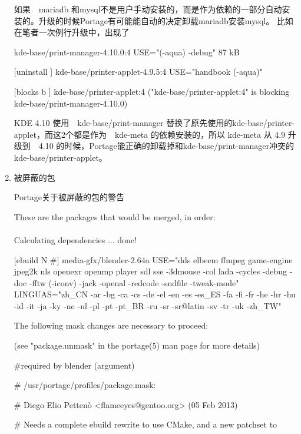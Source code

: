 \begin{enumerate}
如果　mariadb 和mysql不是用户手动安装的，而是作为依赖的一部分自动安装的。升级的时候Portage有可能能自动的决定卸载mariadb安装mysql。
比如在笔者一次例行升级中，出现了　

\begin{code}
\begin{flushleft}
[ebuild  N     ] kde-base/print-manager-4.10.0:4  USE="(-aqua) -debug" 87 kB

[uninstall     ] kde-base/printer-applet-4.9.5:4  USE="handbook (-aqua)"

[blocks b      ] kde-base/printer-applet:4 ("kde-base/printer-applet:4" is blocking kde-base/print-manager-4.10.0)

\end{flushleft}
\end{code}

KDE 4.10 使用　kde-base/print-manager 替换了原先使用的kde-base/printer-applet，而这2个都是作为　kde-meta 的依赖安装的，所以 kde-meta 从 4.9 升级到　4.10 的时候，Portage能正确的卸载掉和kde-base/print-manager冲突的kde-base/printer-applet。

\item 被屏蔽的包

\begin{example}{Portage关于被屏蔽的包的警告}

\begin{code}

These are the packages that would be merged, in order:\\
~\\
Calculating dependencies               ... done!


[ebuild  N   \#] media-gfx/blender-2.64a  USE="dds elbeem ffmpeg game-engine jpeg2k nls openexr openmp player sdl sse -3dmouse -col
lada -cycles -debug -doc -fftw (-iconv) -jack -openal -redcode -sndfile -tweak-mode" LINGUAS="zh\_CN -ar -bg -ca -cs -de -el -en -es
 -es\_ES -fa -fi -fr -he -hr -hu -id -it -ja -ky -ne -nl -pl -pt -pt\_BR -ru -sr -sr@latin -sv -tr -uk -zh\_TW" 

The following mask changes are necessary to proceed:

\qquad (see "package.unmask" in the portage(5) man page for more details)

\#required by blender (argument)

\# /usr/portage/profiles/package.mask:

\# Diego Elio Pettenò <flameeyes@gentoo.org> (05 Feb 2013)

\# Needs a complete ebuild rewrite to use CMake, and a new patchset to


\end{code}
\end{example}
\end{enumerate}
